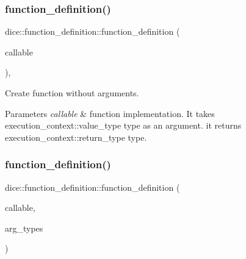 \subsubsection{\texorpdfstring{function\+\_\+definition()}{function\_definition()}\hspace{0.1cm}{\footnotesize\ttfamily [1/2]}}
{\footnotesize\ttfamily dice\+::function\+\_\+definition\+::function\+\_\+definition (\begin{DoxyParamCaption}\item[{fn\+::callable\+\_\+type}]{callable }\end{DoxyParamCaption})\hspace{0.3cm}{\ttfamily [inline]}, {\ttfamily [explicit]}}



Create function without arguments. 


\begin{DoxyParams}{Parameters}
{\em callable} & function implementation. It takes execution\+\_\+context\+::value\+\_\+type type as an argument. it returns execution\+\_\+context\+::return\+\_\+type type. \\
\hline
\end{DoxyParams}
\mbox{\label{classdice_1_1function__definition_a8722346987d1cc191032dffb5e912f6f}} 
\subsubsection{\texorpdfstring{function\+\_\+definition()}{function\_definition()}\hspace{0.1cm}{\footnotesize\ttfamily [2/2]}}
{\footnotesize\ttfamily dice\+::function\+\_\+definition\+::function\+\_\+definition (\begin{DoxyParamCaption}\item[{fn\+::callable\+\_\+type}]{callable,  }\item[{std\+::vector$<$ \mbox{\hyperlink{value_8hpp_ab9af7d8ecc381e026ca4d07a745f23eb}{type\+\_\+id}} $>$ \&\&}]{arg\+\_\+types }\end{DoxyParamCaption})\hspace{0.3cm}{\ttfamily [inline]}}



